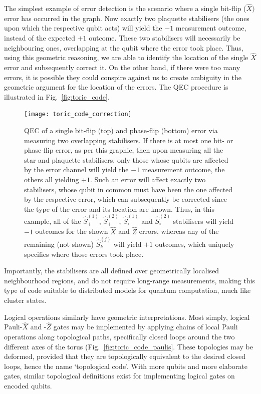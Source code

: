 The simplest example of error detection is the scenario where a single bit-flip ($\hat{X})$ error has occurred in the graph. Now exactly two plaquette stabilisers (the ones upon which the respective qubit acts) will yield the $-1$ measurement outcome, instead of the expected $+1$ outcome. These two stabilisers will necessarily be neighbouring ones, overlapping at the qubit where the error took place. Thus, using this geometric reasoning, we are able to identify the location of the single $\hat{X}$ error and subsequently correct it. On the other hand, if there were too many errors, it is possible they could conspire against us to create ambiguity in the geometric argument for the location of the errors. The QEC procedure is illustrated in Fig.~\ref{fig:toric_code}.

\begin{figure}[htpb]
	\texttt{[image: toric\_code\_correction]}
	\caption{QEC of a single bit-flip (top) and phase-flip (bottom) error via measuring two overlapping stabilisers. If there is at most one bit- or phase-flip error, as per this graphic, then upon measuring all the star and plaquette stabilisers, only those whose qubits are affected by the error channel will yield the $-1$ measurement outcome, the others all yielding $+1$. Such an error will affect exactly two stabilisers, whose qubit in common must have been the one affected by the respective error, which can subsequently be corrected since the type of the error and its location are known. Thus, in this example, all of the $\hat{S}_+^{(1)}$, $\hat{S}_+^{(2)}$, $\hat{S}_\square^{(1)}$ and $\hat{S}_\square^{(2)}$ stabilisers will yield $-1$ outcomes for the shown $\hat{X}$ and $\hat{Z}$ errors, whereas any of the remaining (not shown) $\hat{S}_k^{(j)}$ will yield $+1$ outcomes, which uniquely specifies where those errors took place.}\label{fig:toric_corr}	
\end{figure}

Importantly, the stabilisers are all defined over geometrically localised neighbourhood regions, and do not require long-range measurements, making this type of code suitable to distributed models for quantum computation, much like cluster states.

Logical operations similarly have geometric interpretations. Most simply, logical Pauli-$\hat{X}$ and -$\hat{Z}$ gates may be implemented by applying chains of local Pauli operations along topological paths, specifically closed loops around the two different axes of the torus (Fig.~\ref{fig:toric_code_paulis}. These topologies may be deformed, provided that they are topologically equivalent to the desired closed loops, hence the name `topological code'. With more qubits and more elaborate gates, similar topological definitions exist for implementing logical gates on encoded qubits.

